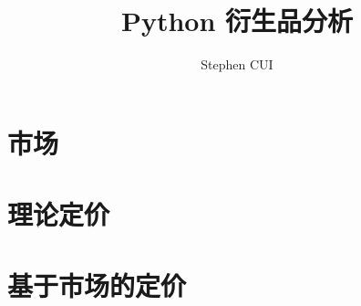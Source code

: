 \documentclass{book}
\title{Python 衍生品分析}
\author{Stephen CUI}
\begin{document}
\frontmatter
\tableofcontents
\mainmatter
\part{市场}

\part{理论定价}
\part{基于市场的定价}
\end{document}
